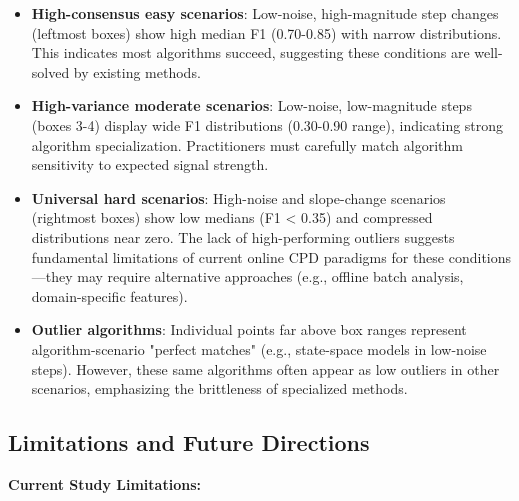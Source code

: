 \documentclass[journal,article,submit,pdftex,moreauthors]{Definitions/mdpi}
\begin{document}
\begin{itemize}
    \item \textbf{High-consensus easy scenarios}: Low-noise, high-magnitude step changes (leftmost boxes) show high median F1 (0.70-0.85) with narrow distributions. This indicates most algorithms succeed, suggesting these conditions are well-solved by existing methods.
    
    \item \textbf{High-variance moderate scenarios}: Low-noise, low-magnitude steps (boxes 3-4) display wide F1 distributions (0.30-0.90 range), indicating strong algorithm specialization. Practitioners must carefully match algorithm sensitivity to expected signal strength.
    
    \item \textbf{Universal hard scenarios}: High-noise and slope-change scenarios (rightmost boxes) show low medians (F1 < 0.35) and compressed distributions near zero. The lack of high-performing outliers suggests fundamental limitations of current online CPD paradigms for these conditions—they may require alternative approaches (e.g., offline batch analysis, domain-specific features).
    
    \item \textbf{Outlier algorithms}: Individual points far above box ranges represent algorithm-scenario "perfect matches" (e.g., state-space models in low-noise steps). However, these same algorithms often appear as low outliers in other scenarios, emphasizing the brittleness of specialized methods.
\end{itemize}


\subsection{Limitations and Future Directions}

\textbf{Current Study Limitations:}
\end{document}
